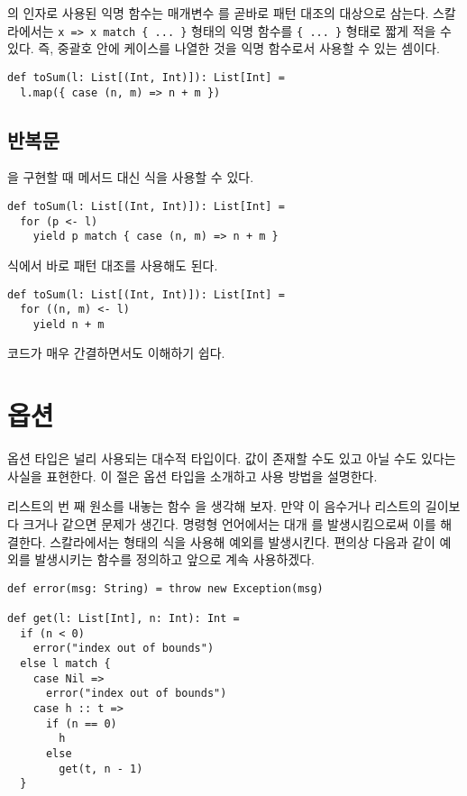 의 인자로 사용된 익명 함수는 매개변수 를 곧바로 패턴 대조의
대상으로 삼는다. 스칼라에서는 \verb!x => x match { ... }! 형태의 익명 함수를
\verb!{ ... }! 형태로 짧게 적을 수 있다. 즉, 중괄호 안에 케이스를 나열한 것을
익명 함수로서 사용할 수 있는 셈이다.

\begin{verbatim}
def toSum(l: List[(Int, Int)]): List[Int] =
  l.map({ case (n, m) => n + m })
\end{verbatim}

\subsection{ 반복문}

을 구현할 때  메서드 대신  식을 사용할 수 있다.

\begin{verbatim}
def toSum(l: List[(Int, Int)]): List[Int] =
  for (p <- l)
    yield p match { case (n, m) => n + m }
\end{verbatim}

 식에서 바로 패턴 대조를 사용해도 된다.

\begin{verbatim}
def toSum(l: List[(Int, Int)]): List[Int] =
  for ((n, m) <- l)
    yield n + m
\end{verbatim}

코드가 매우 간결하면서도 이해하기 쉽다.

\section{옵션}

옵션 타입은 널리 사용되는 대수적 타입이다. 값이 존재할 수도 있고 아닐 수도
있다는 사실을 표현한다. 이 절은 옵션 타입을 소개하고 사용 방법을 설명한다.

리스트의 번 째 원소를 내놓는 함수 을 생각해 보자. 만약
이 음수거나 리스트의 길이보다 크거나 같으면 문제가 생긴다. 명령형
언어에서는 대개 를 발생시킴으로써 이를 해결한다.
스칼라에서는  형태의 식을 사용해 예외를 발생시킨다.
편의상 다음과 같이 예외를 발생시키는  함수를 정의하고 앞으로 계속
사용하겠다.

\begin{verbatim}
def error(msg: String) = throw new Exception(msg)

def get(l: List[Int], n: Int): Int =
  if (n < 0)
    error("index out of bounds")
  else l match {
    case Nil =>
      error("index out of bounds")
    case h :: t =>
      if (n == 0)
        h
      else
        get(t, n - 1)
  }
\end{verbatim}

